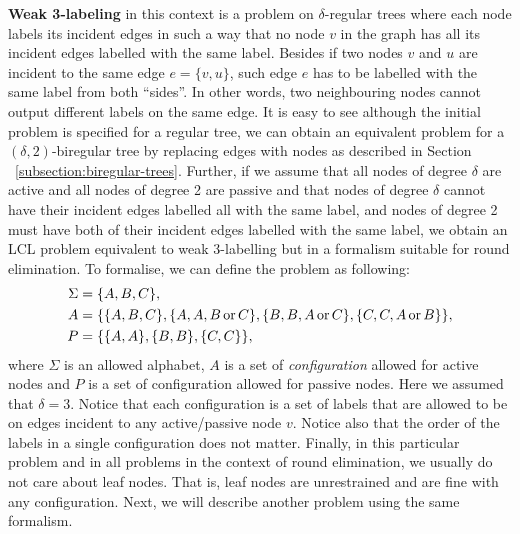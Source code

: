 \textbf{Weak 3-labeling} in this context is a problem on $\delta$-regular trees where
each node labels its incident edges in such a way that no node $v$ in the graph
has all its incident edges labelled with the same label. Besides if two
nodes $v$ and $u$ are incident to the same edge $e = \{v, u\}$, such
edge $e$ has to be labelled with the same label from both ``sides''. In other words,
two neighbouring nodes cannot output different labels on the same edge.
It is easy to see although the initial problem is specified for a regular
tree, we can obtain an equivalent problem for a $(\delta, 2)$-biregular tree
by replacing edges with nodes as described in Section ~\ref{subsection:biregular-trees}.
Further, if we assume that all nodes of degree $\delta$ are active and all nodes of 
degree 2 are passive and that nodes of degree $\delta$ cannot have their incident
edges labelled all with the same label, and nodes of degree 2 must have both of their
incident edges labelled with the same label, we obtain an LCL problem equivalent to
weak 3-labelling but in a formalism suitable for round elimination. To formalise, we
can define the problem as following:
\begin{align*}
\Sigma &= \{A, B, C\}, \\
A &= \{ \{A, B, C\}, \{A, A, B \operatorname{or} C\}, \{B, B, A \operatorname{or} C\}, \{C, C, A \operatorname{or} B\} \}, \\
P &= \{ \{A, A\}, \{B, B\}, \{C, C\}\},
\end{align*}
where $\Sigma$ is an allowed alphabet, $A$ is a set of \emph{configuration}
allowed for active nodes and $P$ is a set of configuration allowed for
passive nodes. Here we assumed that $\delta = 3$. Notice that each
configuration is a set of labels that are allowed to be on edges 
incident to any active/passive node $v$. Notice also that the order of
the labels in a single configuration does not matter. Finally, in this particular problem
and in all problems in the context of round elimination, we usually do not care about
leaf nodes. That is, leaf nodes are unrestrained and are fine with any 
configuration.  Next, we will
describe another problem using the same formalism.

